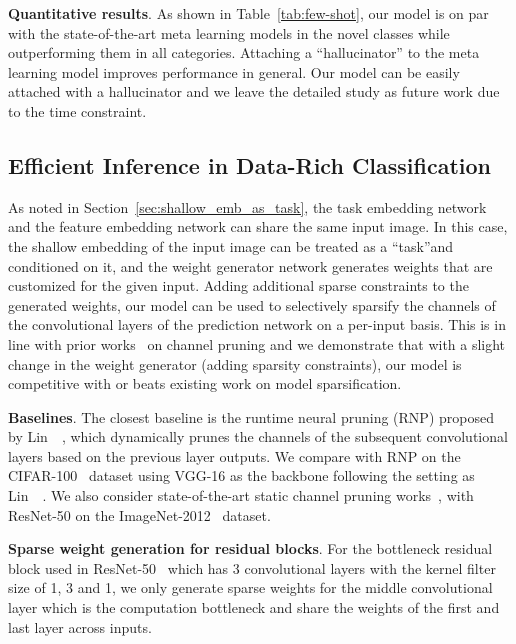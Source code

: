 \documentclass[10pt,twocolumn,letterpaper]{article}
\newcommand\minisection[1]{\vspace{2mm}\noindent \textbf{#1}}
\begin{document}
\minisection{Quantitative results}. As shown in Table~\ref{tab:few-shot}, our
model is on par with the state-of-the-art meta learning models in the 
novel classes while outperforming them in all categories. Attaching a ``hallucinator'' to the meta learning model improves performance in
general. Our model can be easily attached with a hallucinator and we leave
the detailed study as future work due to the time constraint. 

\subsection{Efficient Inference in Data-Rich Classification}\label{sec:efficient_inference}
As noted in Section~\ref{sec:shallow_emb_as_task}, the task embedding
network and the feature embedding network can share the same input image. 
In this case, the shallow embedding of the input image can be treated as a
``task''and conditioned on it, and the weight generator network generates weights that
are customized for the given input. Adding additional sparse constraints to 
the generated weights, our model can be used to selectively sparsify the channels
of the convolutional layers of the prediction network on a per-input basis. This
is in line with prior works~\cite{lin2017runtime, luo2017thinet, he2017channel} on channel pruning and we demonstrate that with a slight
change in the weight generator (adding sparsity constraints), our model is 
competitive with or beats existing work on model 
sparsification. 

\minisection{Baselines}. The closest baseline is the runtime neural pruning (RNP) 
proposed by Lin~\etal~\cite{lin2017runtime}, which dynamically prunes the channels
of the subsequent convolutional layers based on the previous layer outputs. We
compare with RNP on the CIFAR-100~\cite{krizhevsky2009learning} dataset using VGG-16 as the backbone following the setting as Lin~\etal~\cite{lin2017runtime}. We also
consider state-of-the-art static channel pruning works~\cite{he2017channel, luo2017thinet,huang2017data, li2016pruning}, with ResNet-50 on the 
ImageNet-2012~\cite{russakovsky2015imagenet} dataset.

\minisection{Sparse weight generation for residual blocks}. For the bottleneck residual block used in ResNet-50~\cite{he2016deep} which has 3 convolutional layers with the kernel filter
size of 1, 3 and 1, we only generate sparse
weights for the middle convolutional layer which is the computation bottleneck and share the weights of the first and last layer across inputs.
\end{document}

